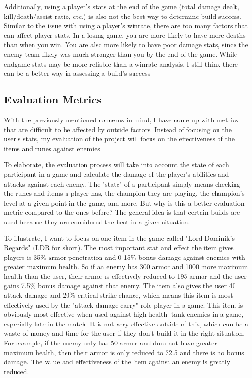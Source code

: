 \documentclass[10pt,twocolumn]{article}
\begin{document}
Additionally, using a player's stats at the end of the game (total damage dealt, kill/death/assist ratio, etc.) is also not the best way to determine build success.
Similar to the issue with using a player's winrate, there are too many factors that can affect player stats.
In a losing game, you are more likely to have more deaths than when you win.
You are also more likely to have poor damage stats, since the enemy team likely was much stronger than you by the end of the game.
While endgame stats may be more reliable than a winrate analysis, I still think there can be a better way in assessing a build's success.

\subsection{Evaluation Metrics}
With the previously mentioned concerns in mind, I have come up with metrics that are difficult to be affected by outside factors.
Instead of focusing on the user's stats, my evaluation of the project will focus on the effectiveness of the items and runes against enemies.

To elaborate, the evaluation process will take into account the state of each participant in a game and calculate the damage of the player's abilities and attacks against each enemy.
The "state" of a participant simply means checking the runes and items a player has, the champion they are playing, the champion's level at a given point in the game, and more.
But why is this a better evaluation metric compared to the ones before?
The general idea is that certain builds are used because they are considered the best in a given situation.

To illustrate, I want to focus on one item in the game called "Lord Dominik's Regards" (LDR for short).
The most important stat and effect the item gives players is 35\% armor penetration and 0-15\% bonus damage against enemies with greater maximum health.
So if an enemy has 300 armor and 1000 more maximum health than the user, their armor is effectively reduced to 195 armor and the user gains 7.5\% bonus damage against that enemy\cite{LolWikiArmorPenetrationCalculation}.
The item also gives the user 40 attack damage and 20\% critical strike chance, which means this item is most effectively used by the "attack damage carry" role player in a game.
This item is obviously most effective when used against high health, tank enemies in a game, especially late in the match.
It is not very effective outside of this, which can be a waste of money and time for the user if they don't build it in the right situation.
For example, if the enemy only has 50 armor and does not have greater maximum health, then their armor is only reduced to 32.5 and there is no bonus damage.
The value and effectiveness of the item against an enemy is greatly reduced.
\end{document}
